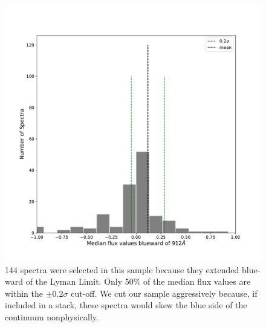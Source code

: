 \documentclass[preprint2,times,tighten]{aastex6}
\begin{document}
\begin{figure}[ht]
    \begin{center}
    \includegraphics[width=\columnwidth]{ll_cut.pdf}
    \caption{144 spectra were selected in this sample because they extended blue-ward of the Lyman Limit. Only 50\% of the median flux values are within the $\pm 0.2\sigma$ cut-off. We cut our sample aggressively because, if included in a stack, these spectra would skew the blue side of the continuum nonphysically.}
    \label{fig:ll_cut}
    \end{center}
\end{figure}
\end{document}
